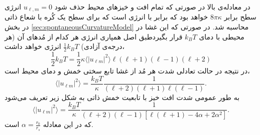 در معادله‌ی بالا در صورتی که تمام افت و خیز‌های محیط حذف شود
$u_{\ell,m}=0$
انرژی سطح برابر
$8\pi\kappa$
خواهد بود که برابر با انرژی است که برای سطح یک کُره با شعاع ذاتی در بخش
\ref{sec:spontaneousCurvatureModel}
محاسبه شد. در صورتی که این غشا در محیطی با دمای
$k_BT$
قرار بگیردطبق اصل همپاری انرژی  هر کدام از مُدهای آن (هر درجه‌ی آزادی) 
$\frac{1}{2}k_BT$
انرژی خواهد داشت،
\begin{equation}
\frac{1}{2}k_BT=\frac{1}{2}\kappa\langle|u_{\ell m}|^2\rangle\ell(\ell+1)(\ell-1)(\ell+2)
\end{equation}
در نتیجه در حالت تعادلی شدت هر مُد از غشا تابع سختی خمش و دمای محیط است،
\begin{equation}
\langle|u_{\ell m}|^2\rangle=\frac{k_BT}{\kappa}\frac{1}{(\ell+2)(\ell+1)\ell(\ell-1)}.
\label{eq:bendingFluctuations}
\end{equation}
به طور عمومی شدت افت خیز با تابعیت خمش ذاتی به شکل زیر تعریف می‌شود
\cite{milnersafranPRA1987}
\begin{equation}
\langle|u_{\ell m}|^2\rangle=\frac{k_BT}{\kappa}\frac{1}{(\ell+2)(\ell-1)\left[\ell(\ell+1)-4\alpha+2\alpha^2\right]}.
\label{eq:bendingFluctuationsSC}
\end{equation}
که در این معادله 
$\alpha=\frac{r_0}{r_s}$
است.
 
 
 
 
 
 
 
 
 
 